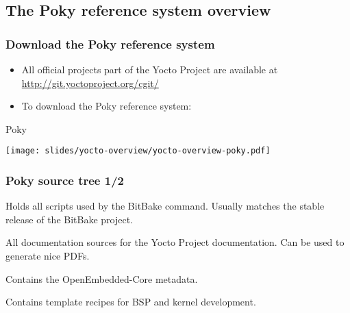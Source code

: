 \subsection{The Poky reference system overview}

\begin{frame}
  \frametitle{Download the Poky reference system}
  \begin{itemize}
    \item All official projects part of the Yocto Project are
          available at \url{http://git.yoctoproject.org/cgit/}
    \item To download the Poky reference system: \\
          {\small
          }
  \end{itemize}
\end{frame}

\begin{frame}{Poky}
  \begin{center}
    \texttt{[image: slides/yocto-overview/yocto-overview-poky.pdf]}
  \end{center}
\end{frame}

\begin{frame}
  \frametitle{Poky source tree 1/2}
  \begin{description}[style=nextline]
  \item[bitbake/] Holds all scripts used by the BitBake command.
    Usually matches the stable release of the BitBake project.
  \item[documentation/] All documentation sources for the Yocto
    Project documentation. Can be used to generate nice PDFs.
  \item[meta/] Contains the OpenEmbedded-Core metadata.
  \item[meta-skeleton/] Contains template recipes for BSP and
    kernel development.
  \end{description}
\end{frame}

